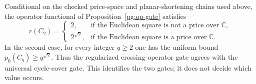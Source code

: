 \begin{theorem}
\label{pg:op-complete}
Conditional on the checked price-space and planar-shortening chains used
above, the operator functional of Proposition~\ref{pg:op-gate} satisfies
\[
 r(C_2)=
 \begin{cases}
 2,&\text{if the Euclidean square is not a price over }\mathbb C,\\
 2^{\sqrt2},&\text{if the Euclidean square is a price over }\mathbb C.
 \end{cases}
 \tag{PG-OP-exact-gate}
\]
In the second case, for every integer $q\geq2$ one has the uniform
bound $p_0(C_q)\geq q^{\sqrt2}$. Thus the regularized crossing-operator
gate agrees with the universal cycle-cover gate. This identifies the
two gates; it does not decide which value occurs.
\end{theorem}
